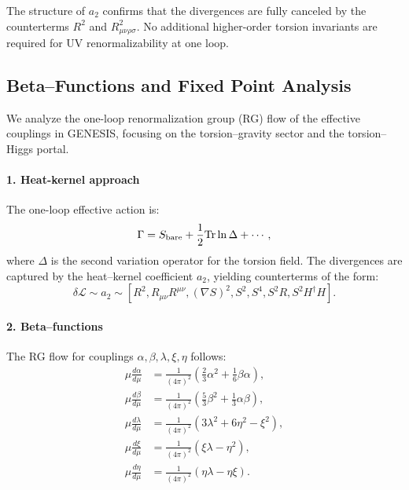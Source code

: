 \documentclass{article}
\begin{document}
The structure of \(a_2\) confirms that the divergences are fully canceled by the counterterms \(R^2\) and \(R_{\mu\nu\rho\sigma}^2\). No additional higher-order torsion invariants are required for UV renormalizability at one loop.



\medskip
\begin{center}
\end{center}
\medskip


\subsection{Beta–Functions and Fixed Point Analysis}
\label{sec:beta_functions}

We analyze the one-loop renormalization group (RG) flow of the effective couplings in GENESIS, focusing on the torsion–gravity sector and the torsion–Higgs portal.

\paragraph{1. Heat-kernel approach}

The one-loop effective action is:
\[
\Gamma = S_{\rm bare} + \frac{1}{2} \mathrm{Tr} \ln \Delta + \cdots,
\]
where \( \Delta \) is the second variation operator for the torsion field. The divergences are captured by the heat–kernel coefficient \( a_2 \), yielding counterterms of the form:
\[
\delta \mathcal{L} \sim a_2 \sim \left[ R^2, R_{\mu\nu}R^{\mu\nu}, (\nabla S)^2, S^2, S^4, S^2 R, S^2 H^\dagger H \right].
\]

\paragraph{2. Beta–functions}

The RG flow for couplings \( \alpha, \beta, \lambda, \xi, \eta \) follows:
\[
\begin{aligned}
  \mu\frac{d\alpha}{d\mu} &= \frac{1}{(4\pi)^2} \left( \tfrac{2}{3} \alpha^2 + \tfrac{1}{6} \beta \alpha \right),\\
  \mu\frac{d\beta}{d\mu}  &= \frac{1}{(4\pi)^2} \left( \tfrac{5}{3} \beta^2 + \tfrac{1}{3} \alpha \beta \right),\\
  \mu\frac{d\lambda}{d\mu} &= \frac{1}{(4\pi)^2} \left( 3\lambda^2 + 6\eta^2 - \xi^2 \right),\\
  \mu\frac{d\xi}{d\mu} &= \frac{1}{(4\pi)^2} \left( \xi \lambda - \eta^2 \right),\\
  \mu\frac{d\eta}{d\mu} &= \frac{1}{(4\pi)^2} \left( \eta \lambda - \eta \xi \right).
\end{aligned}
\]
\end{document}
